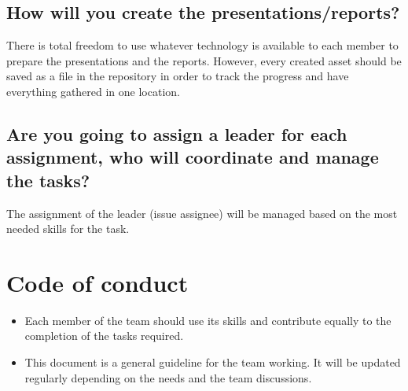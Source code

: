 \documentclass{article}
\begin{document}
    

\subsection{How will you create the presentations/reports?}

There is total freedom to use whatever technology is available to each member to prepare the presentations and the reports. However, every created asset should be saved as a file in the repository in order to track the progress and have everything gathered in one location.


\subsection{Are you going to assign a leader for each assignment, who will coordinate and manage the tasks?}

The assignment of the leader (issue assignee) will be managed based on the most needed skills for the task.

\section{Code of conduct}

\begin{itemize}
    \item Each member of the team should use its skills and contribute equally to the completion of the tasks required.
    \item This document is a general guideline for the team working. It will be updated regularly depending on the needs and the team discussions.
\end{itemize}






%
\end{document}
